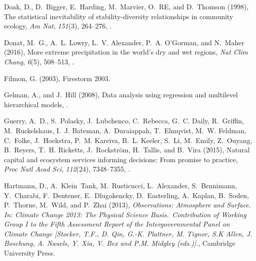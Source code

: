 \documentclass[draft,linenumbers]{AGUJournal}
\begin{document}
\begin{thebibliography}{38}
Doak, D., D.~Bigger, E.~Harding, M.~Marvier, O.~{RE}, and D.~Thomson (1998),
		The statistical inevitability of stability{-}diversity relationships in
  community ecology, \textit{Am Nat}, \textit{151}(3), 264--276,
  .

Donat, M.~G., A.~L. Lowry, L.~V. Alexander, P.~A. {O'Gorman}, and N.~Maher
  (2016), More extreme precipitation in the world's dry and wet regions,
  \textit{Nat Clim Chang}, \textit{6}(5), 508--513, .

Filmon, G. (2003), Firestorm 2003.

Gelman, A., and J.~Hill (2008), Data analysis using regression and multilevel
  hierarchical models, .

Guerry, A.~D., S.~Polasky, J.~Lubchenco, C.~Rebecca, G.~C. Daily, R.~Griffin,
  M.~Ruckelshaus, I.~J. Bateman, A.~Duraiappah, T.~Elmqvist, M.~W. Feldman,
  C.~Folke, J.~Hoekstra, P.~M. Kareiva, B.~L. Keeler, S.~Li, M.~Emily,
  Z.~Ouyang, B.~Reyers, T.~H. Ricketts, J.~Rockstr{\"o}m, H.~Tallis, and
  B.~Vira (2015), Natural capital and ecosystem services informing decisions:
  From promise to practice, \textit{Proc Natl Acad Sci}, \textit{112}(24),
  7348--7355, .

Hartmann, D., A.~Klein~Tank, M.~Rusticucci, L.~Alexander,
  S.~Brnnimann, Y.~Charabi, F.~Dentener, E.~Dlugokencky,
  D.~Easterling, A.~Kaplan, B.~Soden, P.~Thorne, M.~Wild, and P.~Zhai (2013),
  \textit{Observations: {Atmosphere and Surface}. In: {Climate Change 2013}:
  The Physical Science Basis.~Contribution of Working Group I to the Fifth
  Assessment Report of the {Intergovernmental Panel on Climate Change}
  {[Stocker, T.F., D. Qin, G.-K. Plattner, M. Tignor, S.K Allen, J. Boschung,
  A. Nauels, Y. Xia, V. Bex and P.M. Midgley (eds.)].}}, Cambridge University
  Press.


\end{thebibliography}
\end{document}

